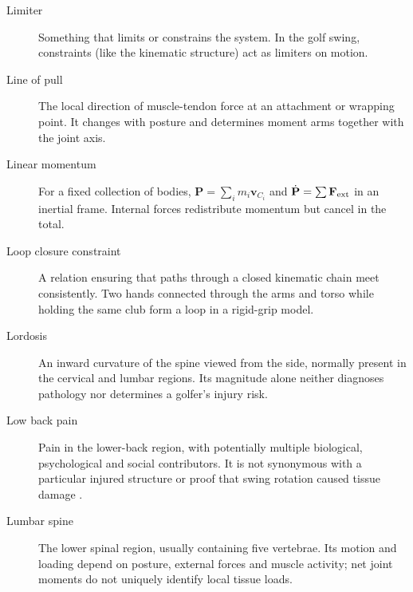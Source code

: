 \begin{description}
\item[Limiter] Something that limits or constrains the system. In the golf swing, constraints (like the kinematic structure) act as limiters on motion.

\item[Line of pull] The local direction of muscle-tendon force at an attachment or wrapping point. It changes with posture and determines moment arms together with the joint axis.

\item[Linear momentum] For a fixed collection of bodies, $\mathbf{P}=\sum_i m_i\mathbf{v}_{C_i}$ and $\dot{\mathbf{P}}=\sum\mathbf{F}_{\rm ext}$ in an inertial frame. Internal forces redistribute momentum but cancel in the total.

\item[Loop closure constraint] A relation ensuring that paths through a closed kinematic chain meet consistently. Two hands connected through the arms and torso while holding the same club form a loop in a rigid-grip model.

\item[Lordosis] An inward curvature of the spine viewed from the side, normally present in the cervical and lumbar regions. Its magnitude alone neither diagnoses pathology nor determines a golfer's injury risk.

\item[Low back pain] Pain in the lower-back region, with potentially multiple biological, psychological and social contributors. It is not synonymous with a particular injured structure or proof that swing rotation caused tissue damage \citep{glossaryIASP}.

\item[Lumbar spine] The lower spinal region, usually containing five vertebrae. Its motion and loading depend on posture, external forces and muscle activity; net joint moments do not uniquely identify local tissue loads.

\end{description}
